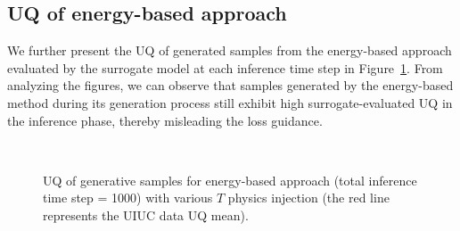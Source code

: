 \subsection{UQ of energy-based approach}
\label{ch7:sect:AppendixUncertainty}
We further present the UQ of generated samples from the energy-based approach evaluated by the surrogate model at each inference time step in Figure~\ref{ch7:fig:uqEnergy}. From analyzing the figures, we can observe that samples generated by the energy-based method during its generation process still exhibit high surrogate-evaluated UQ in the inference phase, thereby misleading the loss guidance.

\begin{figure}[htbp]
    \centering
    \\[1em]
    \caption{UQ of generative samples for energy-based approach (total inference time step = 1000) with various $T$ physics injection (the red line represents the UIUC data UQ mean).}
    \label{ch7:fig:uqEnergy}
\end{figure}